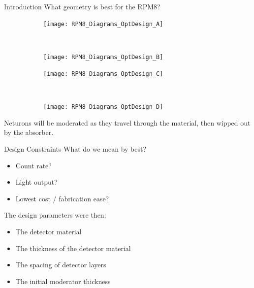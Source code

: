 \documentclass[compress]{beamer}
\begin{document}
\subsection*{}
\begin{frame}{Introduction}
What geometry is best for the RPM8?
\begin{figure}
    \centering
    \begin{subfigure}[b]{0.25\textwidth}
        \texttt{[image: RPM8\_Diagrams\_OptDesign\_A]}
    \end{subfigure}
    ~
    \begin{subfigure}[b]{0.25\textwidth}
        \texttt{[image: RPM8\_Diagrams\_OptDesign\_B]}
    \end{subfigure}

    \begin{subfigure}[b]{0.25\textwidth}
        \texttt{[image: RPM8\_Diagrams\_OptDesign\_C]}
    \end{subfigure}
    ~
    \begin{subfigure}[b]{0.25\textwidth}
        \texttt{[image: RPM8\_Diagrams\_OptDesign\_D]}
    \end{subfigure}
    \label{fig:OptDesignSchematics}
\end{figure}
Neturons will be moderated as they travel through the material, then wipped out by the absorber.
\end{frame}
\begin{frame}{Design Constraints}
What do we mean by best?
\begin{itemize}
	\small
  \item Count rate? 
  \item Light output?
	\item Lowest cost / fabrication ease?
\end{itemize}
The design parameters were then:
\begin{itemize}
	\small
  \item The detector material
  \item The thickness of the detector material
  \item The spacing of detector layers
  \item The initial moderator thickness
\end{itemize}
\end{frame}
\end{document}
